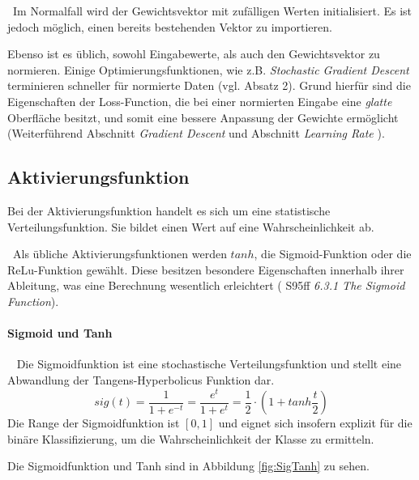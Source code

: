 ~\newline Im Normalfall wird der Gewichtsvektor mit zufälligen Werten initialisiert. Es ist jedoch möglich, einen bereits bestehenden Vektor zu importieren. 

Ebenso ist es üblich, sowohl Eingabewerte, als auch den Gewichtsvektor zu normieren. Einige Optimierungsfunktionen, wie z.B. \textit{Stochastic Gradient Descent} terminieren schneller für normierte Daten (vgl. \cite{GDQuora} Absatz 2). Grund hierfür sind die Eigenschaften der Loss-Function, die bei einer normierten Eingabe eine \textit{glatte} Oberfläche besitzt, und somit eine bessere Anpassung der Gewichte ermöglicht (Weiterführend \cite{GDBoost} Abschnitt \textit{Gradient Descent} und Abschnitt \textit{Learning Rate} ). 
\subsection{Aktivierungsfunktion}
\label{subsec:Aktivierungsfunktion} 
Bei der Aktivierungsfunktion handelt es sich um eine statistische Verteilungsfunktion. Sie bildet einen Wert auf eine Wahrscheinlichkeit ab. 

~\newline Als übliche Aktivierungsfunktionen werden $tanh$, die Sigmoid-Funktion oder die ReLu-Funktion gewählt. Diese besitzen besondere Eigenschaften innerhalb ihrer Ableitung, was eine Berechnung wesentlich erleichtert (\cite{stroetmann} S95ff \textit{6.3.1 The Sigmoid Function}).

\paragraph{Sigmoid und Tanh}~\newline
Die Sigmoidfunktion ist eine stochastische Verteilungsfunktion und stellt eine Abwandlung der Tangens-Hyperbolicus Funktion dar. 
\begin{equation}
\label{eq:sigmoid}
sig(t) = \dfrac{1}{1+e^{-t}}=\dfrac{e^t}{1+ e^t}= \frac{1}{2} \cdot ( 1 + tanh \frac{t}{2})
\end{equation}
Die Range der Sigmoidfunktion ist $[0,1]$ und eignet sich insofern explizit für die binäre Klassifizierung, um die Wahrscheinlichkeit der Klasse zu ermitteln. 

Die Sigmoidfunktion und Tanh sind in Abbildung \ref{fig:SigTanh} zu sehen. 

